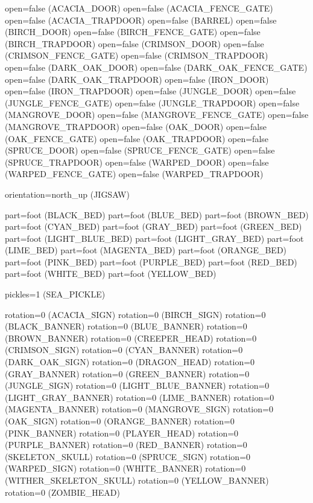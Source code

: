 \documentclass[11pt]{article}
\begin{document}
open=false (ACACIA_DOOR)
open=false (ACACIA_FENCE_GATE)
open=false (ACACIA_TRAPDOOR)
open=false (BARREL)
open=false (BIRCH_DOOR)
open=false (BIRCH_FENCE_GATE)
open=false (BIRCH_TRAPDOOR)
open=false (CRIMSON_DOOR)
open=false (CRIMSON_FENCE_GATE)
open=false (CRIMSON_TRAPDOOR)
open=false (DARK_OAK_DOOR)
open=false (DARK_OAK_FENCE_GATE)
open=false (DARK_OAK_TRAPDOOR)
open=false (IRON_DOOR)
open=false (IRON_TRAPDOOR)
open=false (JUNGLE_DOOR)
open=false (JUNGLE_FENCE_GATE)
open=false (JUNGLE_TRAPDOOR)
open=false (MANGROVE_DOOR)
open=false (MANGROVE_FENCE_GATE)
open=false (MANGROVE_TRAPDOOR)
open=false (OAK_DOOR)
open=false (OAK_FENCE_GATE)
open=false (OAK_TRAPDOOR)
open=false (SPRUCE_DOOR)
open=false (SPRUCE_FENCE_GATE)
open=false (SPRUCE_TRAPDOOR)
open=false (WARPED_DOOR)
open=false (WARPED_FENCE_GATE)
open=false (WARPED_TRAPDOOR)

orientation=north_up (JIGSAW)

part=foot (BLACK_BED)
part=foot (BLUE_BED)
part=foot (BROWN_BED)
part=foot (CYAN_BED)
part=foot (GRAY_BED)
part=foot (GREEN_BED)
part=foot (LIGHT_BLUE_BED)
part=foot (LIGHT_GRAY_BED)
part=foot (LIME_BED)
part=foot (MAGENTA_BED)
part=foot (ORANGE_BED)
part=foot (PINK_BED)
part=foot (PURPLE_BED)
part=foot (RED_BED)
part=foot (WHITE_BED)
part=foot (YELLOW_BED)

pickles=1 (SEA_PICKLE)

rotation=0 (ACACIA_SIGN)
rotation=0 (BIRCH_SIGN)
rotation=0 (BLACK_BANNER)
rotation=0 (BLUE_BANNER)
rotation=0 (BROWN_BANNER)
rotation=0 (CREEPER_HEAD)
rotation=0 (CRIMSON_SIGN)
rotation=0 (CYAN_BANNER)
rotation=0 (DARK_OAK_SIGN)
rotation=0 (DRAGON_HEAD)
rotation=0 (GRAY_BANNER)
rotation=0 (GREEN_BANNER)
rotation=0 (JUNGLE_SIGN)
rotation=0 (LIGHT_BLUE_BANNER)
rotation=0 (LIGHT_GRAY_BANNER)
rotation=0 (LIME_BANNER)
rotation=0 (MAGENTA_BANNER)
rotation=0 (MANGROVE_SIGN)
rotation=0 (OAK_SIGN)
rotation=0 (ORANGE_BANNER)
rotation=0 (PINK_BANNER)
rotation=0 (PLAYER_HEAD)
rotation=0 (PURPLE_BANNER)
rotation=0 (RED_BANNER)
rotation=0 (SKELETON_SKULL)
rotation=0 (SPRUCE_SIGN)
rotation=0 (WARPED_SIGN)
rotation=0 (WHITE_BANNER)
rotation=0 (WITHER_SKELETON_SKULL)
rotation=0 (YELLOW_BANNER)
rotation=0 (ZOMBIE_HEAD)
\end{document}
